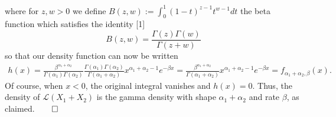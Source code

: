 \documentclass[10pt]{article}
\newcommand{\1}[1]{\mathbbm{1}_{#1}}
\newcommand{\mc}[1]{\mathcal{#1}}
\begin{document}
    where for $z,w>0$ we define $B(z,w):=\int_0^1(1-t)^{z-1}t^{w-1}dt$ the beta function which satisfies the identity [1]
    \[B(z,w)=\frac{\Gamma(z)\Gamma(w)}{\Gamma(z+w)}\] 
    so that our density function can now be written
    \begin{align*}
        h(x)=\frac{\beta^{\alpha_1+\alpha_2}}{\Gamma(\alpha_1)\Gamma(\alpha_2)}\frac{\Gamma(\alpha_1)\Gamma(\alpha_2)}{\Gamma(\alpha_1+\alpha_2)}x^{\alpha_1+\alpha_2-1}e^{-\beta x}=\frac{\beta^{\alpha_1+\alpha_2}}{\Gamma(\alpha_1+\alpha_2)}x^{\alpha_1+\alpha_2-1}e^{-\beta x}=f_{\alpha_1+\alpha_2,\beta}(x).
    \end{align*}
    Of course, when $x<0$, the original integral vanishes and $h(x)=0$. Thus, the density of $\mc{L}(X_1+X_2)$ is the gamma density with shape $\alpha_1+\alpha_2$ and rate $\beta$, as claimed.\hfill{$\qed$}\\[5pt]
\end{document}
